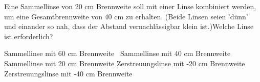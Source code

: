 \documentclass[11pt]{exam}
\begin{document}
\begin{questions}
\vspace{3mm}\question Eine Sammellinse von 20 cm Brennweite soll mit einer Linse kombiniert werden, um eine Gesamtbrennweite von 40 cm zu erhalten. (Beide Linsen seien ’dünn’ und einander so nah, dass der Abstand vernachlässigbar klein ist.)Welche Linse ist erforderlich?

\begin{choices}
	\choice Sammellinse mit 60 cm Brennweite
	\choice  Sammellinse mit 40 cm Brennweite
	\choice Sammellinse mit 20 cm Brennweite
	\choice Zerstreuungslinse mit -20 cm Brennweite
	\choice Zerstreuungslinse mit -40 cm Brennweite
\end{choices}

\vspace{3mm}\end{questions}
\end{document}

